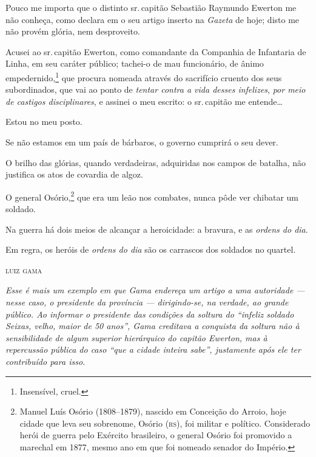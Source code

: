 Pouco me importa que o distinto sr.\,capitão Sebastião Raymundo Ewerton
me não conheça, como declara em o seu artigo inserto na \emph{Gazeta} de
hoje; disto me não provém glória, nem desproveito.

Acusei ao sr.\,capitão Ewerton, como comandante da Companhia de
Infantaria de Linha, em seu caráter público; tachei-o de mau
funcionário, de ânimo empedernido,\footnote{Insensível, cruel.} que
procura nomeada através do sacrifício cruento dos seus subordinados, que
vai ao ponto de \emph{tentar contra a vida desses infelizes}, \emph{por
meio de castigos disciplinares}, e assinei o meu escrito: o sr.\,capitão
me entende\ldots{}

Estou no meu posto.

Se não estamos em um país de bárbaros, o governo cumprirá o seu dever.

O brilho das glórias, quando verdadeiras, adquiridas nos campos de
batalha, não justifica os atos de covardia de algoz.

O general Osório,\footnote{Manuel Luís Osório (1808--1879), nascido em
  Conceição do Arroio, hoje cidade que leva seu sobrenome, Osório (\textsc{rs}),
  foi militar e político. Considerado herói de guerra pelo Exército
  brasileiro, o general Osório foi promovido a marechal em 1877, mesmo
  ano em que foi nomeado senador do Império.}
que era um leão nos
combates, nunca pôde ver chibatar um soldado.

Na guerra há dois meios de alcançar a heroicidade: a bravura, e as
\emph{ordens do dia}.

Em regra, os heróis de \emph{ordens do dia} são os carrascos dos
soldados no quartel.

\medskip
\hfill\textsc{luiz gama}


\begin{resumo}
\emph{Esse é mais um exemplo em que Gama endereça um artigo a uma
autoridade --- nesse caso, o presidente da província --- dirigindo-se, na
verdade, ao grande público. Ao informar o presidente das condições da
soltura do ``infeliz soldado Seixas, velho, maior de 50 anos'', Gama
creditava a conquista da soltura não à sensibilidade de algum superior
hierárquico do capitão Ewerton, mas à repercussão pública do caso ``que a
cidade inteira sabe'', justamente após ele ter contribuído para isso.}
\end{resumo}


